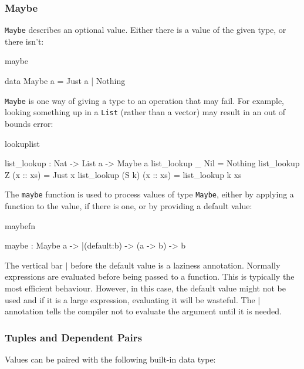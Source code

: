 \subsubsection{Maybe}

\texttt{Maybe} describes an optional value. Either there is a value of the given type,
or there isn't:

\begin{SaveVerbatim}{maybe}

data Maybe a = Just a | Nothing

\end{SaveVerbatim}

\noindent
\texttt{Maybe} is one way of giving a type to an operation that may fail. For example,
looking something up in a \texttt{List} (rather than a vector) may result in an out of
bounds error:

\begin{SaveVerbatim}{lookuplist}

list_lookup : Nat -> List a -> Maybe a
list_lookup _     Nil       = Nothing
list_lookup Z     (x :: xs) = Just x
list_lookup (S k) (x :: xs) = list_lookup k xs

\end{SaveVerbatim}

\noindent
The \texttt{maybe} function is used to process values of type \texttt{Maybe}, 
either by applying a function to the value, if there is one, or by providing a default value:

\begin{SaveVerbatim}{maybefn}

maybe : Maybe a -> |(default:b) -> (a -> b) -> b

\end{SaveVerbatim}

\noindent
The vertical bar $\mid$ before the default value is a laziness annotation. Normally
expressions are evaluated before being passed to a function. This is typically
the most efficient behaviour. However, in this case, the default value might
not be used and if it is a large expression, evaluating it will be wasteful.
The $\mid$ annotation tells the compiler not to evaluate the argument until it is
needed.

\subsubsection{Tuples and Dependent Pairs}

Values can be paired with the following built-in data type:

